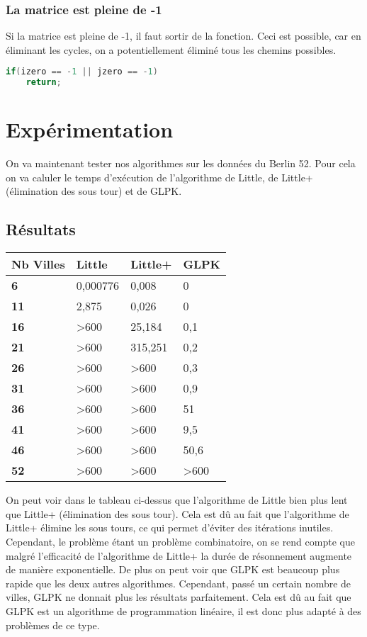 \documentclass[11pt]{article}
\begin{document}
\subsubsection{La matrice est pleine de -1}

Si la matrice est pleine de -1, il faut sortir de la fonction. Ceci est possible, car en éliminant les cycles, on a potentiellement éliminé tous les chemins possibles.
\begin{lstlisting}[language=C]
if(izero == -1 || jzero == -1)
    return;
\end{lstlisting}

\section{Expérimentation}

On va maintenant tester nos algorithmes sur les données du Berlin 52. Pour cela on va caluler le temps d'exécution de l'algorithme de Little, de Little+ (élimination des sous tour) et de GLPK.

\subsection{Résultats}

\begin{table}[!ht]
    \centering
    \begin{tabular}{|l|l|l|l|}
    \hline
        \textbf{Nb Villes} & \textbf{Little} & \textbf{Little+} & \textbf{GLPK} \\ \hline
        \textbf{6} & 0,000776 & 0,008 & 0 \\ \hline
        \textbf{11} & 2,875 & 0,026 & 0 \\ \hline
        \textbf{16} & >600 & 25,184 & 0,1 \\ \hline
        \textbf{21} & >600 & 315,251 & 0,2 \\ \hline
        \textbf{26} & >600 & >600 & 0,3 \\ \hline
        \textbf{31} & >600 & >600 & 0,9 \\ \hline
        \textbf{36} & >600 & >600 & 51 \\ \hline
        \textbf{41} & >600 & >600 & 9,5 \\ \hline
        \textbf{46} & >600 & >600 & 50,6 \\ \hline
        \textbf{52} & >600 & >600 & >600 \\ \hline
    \end{tabular}
\end{table}

On peut voir dans le tableau ci-dessus que l'algorithme de Little bien plus lent que Little+ (élimination des sous tour). Cela est dû au fait que l'algorithme de Little+ élimine les sous tours, ce qui permet d'éviter des itérations inutiles.
Cependant, le problème étant un problème combinatoire, on se rend compte que malgré l'efficacité de l'algorithme de Little+ la durée de résonnement augmente de manière exponentielle.
De plus on peut voir que GLPK est beaucoup plus rapide que les deux autres algorithmes. Cependant, passé un certain nombre de villes, GLPK ne donnait plus les résultats parfaitement. Cela est dû au fait que GLPK est un algorithme de programmation linéaire, il est donc plus adapté à des problèmes de ce type.
\end{document}
